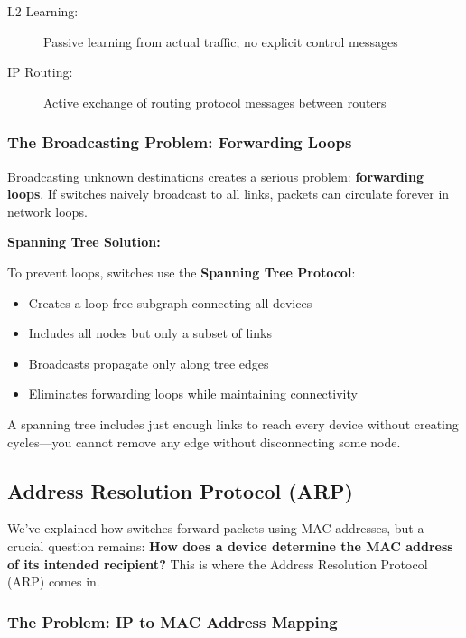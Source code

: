\documentclass[../../compsys.tex]{subfiles}
\begin{document}
\begin{description}
    \item[L2 Learning:] Passive learning from actual traffic; no explicit control messages
    \item[IP Routing:] Active exchange of routing protocol messages between routers
\end{description}

\subsubsection{The Broadcasting Problem: Forwarding Loops}

Broadcasting unknown destinations creates a serious problem: \textbf{forwarding loops}. If switches naively broadcast to all links, packets can circulate forever in network loops.

\textbf{Spanning Tree Solution:}

To prevent loops, switches use the \textbf{Spanning Tree Protocol}:

\begin{itemize}
    \item Creates a loop-free subgraph connecting all devices
    \item Includes all nodes but only a subset of links
    \item Broadcasts propagate only along tree edges
    \item Eliminates forwarding loops while maintaining connectivity
\end{itemize}

A spanning tree includes just enough links to reach every device without creating cycles---you cannot remove any edge without disconnecting some node.

\subsection{Address Resolution Protocol (ARP)}

We've explained how switches forward packets using MAC addresses, but a crucial question remains: \textbf{How does a device determine the MAC address of its intended recipient?} This is where the Address Resolution Protocol (ARP) comes in.

\subsubsection{The Problem: IP to MAC Address Mapping}
\end{document}
